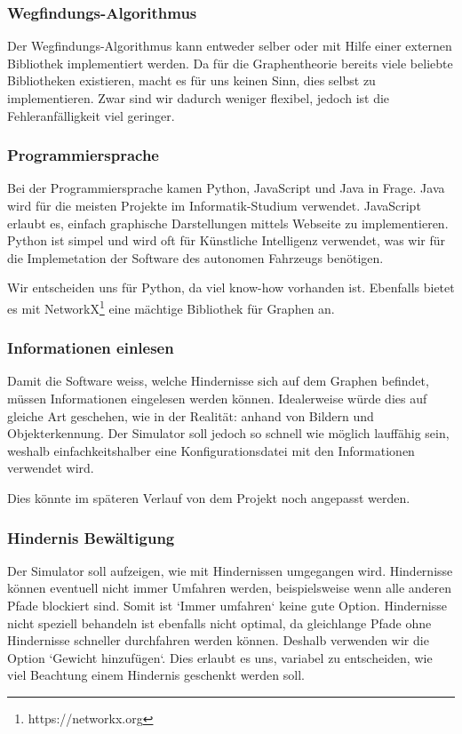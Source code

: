 \documentclass[../main.tex]{subfiles}
\begin{document}
\subsubsection{Wegfindungs-Algorithmus}

Der Wegfindungs-Algorithmus kann entweder selber oder mit Hilfe einer externen Bibliothek 
implementiert werden. Da für die Graphentheorie bereits viele beliebte Bibliotheken existieren, macht es für uns keinen Sinn, dies selbst zu implementieren. Zwar sind wir dadurch weniger flexibel, jedoch ist die Fehleranfälligkeit viel geringer.  

\subsubsection{Programmiersprache}

Bei der Programmiersprache kamen Python, JavaScript und Java in Frage.
Java wird für die meisten Projekte im Informatik-Studium verwendet. JavaScript erlaubt es, einfach graphische Darstellungen mittels Webseite zu implementieren. Python ist simpel und wird oft für Künstliche Intelligenz verwendet, was wir für die Implemetation der Software des autonomen Fahrzeugs benötigen. 

Wir entscheiden uns für Python, da viel know-how vorhanden ist. Ebenfalls bietet es mit NetworkX\footnote{https://networkx.org} eine mächtige Bibliothek für Graphen an.

\subsubsection{Informationen einlesen}

Damit die Software weiss, welche Hindernisse sich auf dem Graphen befindet, müssen Informationen eingelesen werden können. Idealerweise würde dies auf gleiche Art geschehen, wie in der Realität: anhand von Bildern und Objekterkennung. Der Simulator soll jedoch so schnell wie möglich lauffähig sein, weshalb einfachkeitshalber eine Konfigurationsdatei mit den Informationen verwendet wird.

Dies könnte im späteren Verlauf von dem Projekt noch angepasst werden.

\subsubsection{Hindernis Bewältigung}

Der Simulator soll aufzeigen, wie mit Hindernissen umgegangen wird.
Hindernisse können eventuell nicht immer Umfahren werden, beispielsweise wenn alle anderen Pfade blockiert sind. Somit ist `Immer umfahren` keine gute Option. Hindernisse nicht speziell behandeln ist ebenfalls nicht optimal, da gleichlange Pfade ohne Hindernisse schneller durchfahren werden können. Deshalb verwenden wir die Option `Gewicht hinzufügen`. Dies erlaubt es uns, variabel zu entscheiden, wie viel Beachtung einem Hindernis geschenkt werden soll.
\end{document}
